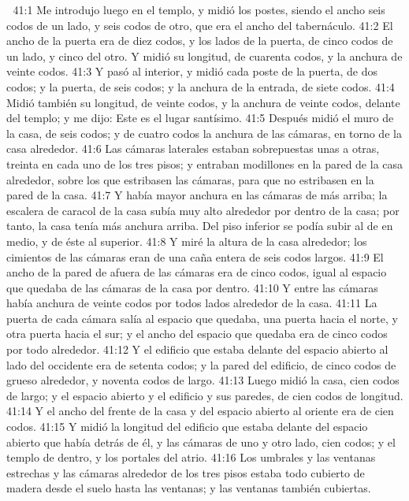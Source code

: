 
41:1 Me introdujo luego en el templo, y midió los postes, siendo el ancho seis codos   de un lado, y seis codos de otro, que era el ancho del tabernáculo.  
41:2 El ancho de la puerta era de diez codos,  y los lados de la puerta, de cinco codos de un lado, y cinco del otro. Y midió su longitud, de cuarenta codos, y la anchura de veinte codos.  
41:3 Y pasó al interior, y midió cada poste de la puerta, de dos codos;  y la puerta, de seis codos; y la anchura de la entrada, de siete codos.  
41:4 Midió también su longitud, de veinte codos,  y la anchura de veinte codos, delante del templo; y me dijo: Este es el lugar santísimo.  
41:5 Después midió el muro de la casa, de seis codos;  y de cuatro codos la anchura de las cámaras, en torno de la casa alrededor.  
41:6 Las cámaras laterales estaban sobrepuestas unas a otras, treinta en cada uno de los tres pisos; y entraban modillones en la pared de la casa alrededor, sobre los que estribasen las cámaras, para que no estribasen en la pared de la casa.  
41:7 Y había mayor anchura en las cámaras de más arriba; la escalera de caracol de la casa subía muy alto alrededor por dentro de la casa; por tanto, la casa tenía más anchura arriba. Del piso inferior se podía subir al de en medio, y de éste al superior.  
41:8 Y miré la altura de la casa alrededor; los cimientos de las cámaras eran de una caña   entera de seis codos largos.  
41:9 El ancho de la pared de afuera de las cámaras era de cinco codos,  igual al espacio que quedaba de las cámaras de la casa por dentro.  
41:10 Y entre las cámaras había anchura de veinte codos   por todos lados alrededor de la casa.  
41:11 La puerta de cada cámara salía al espacio que quedaba, una puerta hacia el norte, y otra puerta hacia el sur; y el ancho del espacio que quedaba era de cinco codos   por todo alrededor.  
41:12 Y el edificio que estaba delante del espacio abierto al lado del occidente era de setenta codos;  y la pared del edificio, de cinco codos de grueso alrededor, y noventa codos de largo.  
41:13 Luego midió la casa, cien codos   de largo; y el espacio abierto y el edificio y sus paredes, de cien codos de longitud.  
41:14 Y el ancho del frente de la casa y del espacio abierto al oriente era de cien codos.  
41:15 Y midió la longitud del edificio que estaba delante del espacio abierto que había detrás de él, y las cámaras de uno y otro lado, cien codos;  y el templo de dentro, y los portales del atrio.  
41:16 Los umbrales y las ventanas estrechas y las cámaras alrededor de los tres pisos estaba todo cubierto de madera desde el suelo hasta las ventanas; y las ventanas también cubiertas.  

